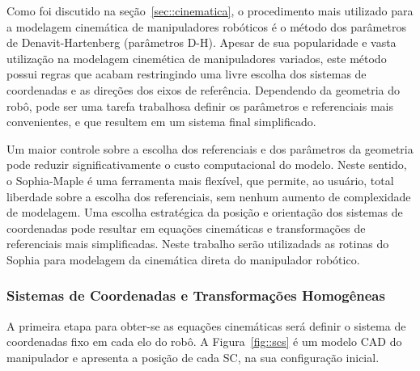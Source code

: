 Como foi discutido na seção~\ref{sec::cinematica}, o procedimento mais utilizado
para a modelagem cinemática de manipuladores robóticos é o método dos parâmetros
de Denavit-Hartenberg (parâmetros D-H). Apesar de sua popularidade e vasta
utilização na modelagem cinemética de manipuladores variados, este método possui
regras que acabam restringindo uma livre escolha dos sistemas de coordenadas e
as direções dos eixos de referência. Dependendo da geometria do robô, pode ser
uma tarefa trabalhosa definir os parâmetros e referenciais mais convenientes, e
que resultem em um sistema final simplificado.

Um maior controle sobre a escolha dos referenciais e dos parâmetros da geometria
pode reduzir significativamente o custo computacional do modelo.
Neste sentido, o Sophia-Maple é uma ferramenta mais flexível, que permite, ao
usuário, total liberdade sobre a escolha dos referenciais, sem nenhum aumento de
complexidade de modelagem. Uma escolha estratégica da posição e orientação dos
sistemas de coordenadas pode resultar em equações cinemáticas e transformações de
referenciais mais simplificadas. Neste trabalho serão utilizadads as rotinas do
Sophia para modelagem da cinemática direta do manipulador robótico.

\subsubsection{Sistemas de Coordenadas e Transformações Homogêneas}

A primeira etapa para obter-se as equações cinemáticas será definir o sistema de
coordenadas fixo em cada elo do robô. A Figura~\ref{fig::scs} é um modelo CAD do
manipulador e apresenta a posição de cada SC, na sua configuração inicial.

